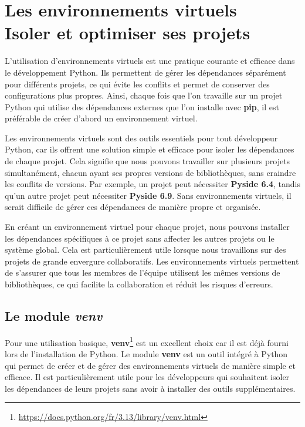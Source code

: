 \chapter[Les environnements virtuels]{Les environnements virtuels \\ Isoler et optimiser ses projets}

\bigskip

L'utilisation d'environnements virtuels est une pratique courante et efficace dans le développement Python. Ils permettent de gérer les dépendances séparément pour différents projets, ce qui évite les conflits et permet de conserver des configurations plus propres. Ainsi, chaque fois que l'on travaille sur un projet Python qui utilise des dépendances externes que l'on installe avec \textbf{pip}, il est préférable de créer d'abord un environnement virtuel.

Les environnements virtuels sont des outils essentiels pour tout développeur Python, car ils offrent une solution simple et efficace pour isoler les dépendances de chaque projet. Cela signifie que nous pouvons travailler sur plusieurs projets simultanément, chacun ayant ses propres versions de bibliothèques, sans craindre les conflits de versions. Par exemple, un projet peut nécessiter \textbf{Pyside 6.4}, tandis qu'un autre projet peut nécessiter \textbf{Pyside 6.9}. Sans environnements virtuels, il serait difficile de gérer ces dépendances de manière propre et organisée.

En créant un environnement virtuel pour chaque projet, nous pouvons installer les dépendances spécifiques à ce projet sans affecter les autres projets ou le système global. Cela est particulièrement utile lorsque nous travaillons sur des projets de grande envergure collaboratifs. Les environnements virtuels permettent de s'assurer que tous les membres de l'équipe utilisent les mêmes versions de bibliothèques, ce qui facilite la collaboration et réduit les risques d'erreurs.

\section{Le module \textit{venv}}
Pour une utilisation basique, \textbf{venv}\footnote{\url{https://docs.python.org/fr/3.13/library/venv.html}} est un excellent choix car il est déjà fourni lors de l'installation de Python. Le module \textbf{venv} est un outil intégré à Python qui permet de créer et de gérer des environnements virtuels de manière simple et efficace. Il est particulièrement utile pour les développeurs qui souhaitent isoler les dépendances de leurs projets sans avoir à installer des outils supplémentaires.

